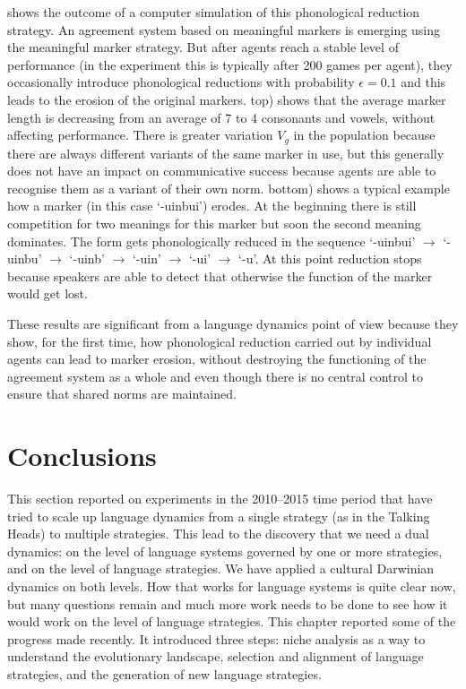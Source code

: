  shows the outcome of a computer simulation of this phonological reduction strategy. An agreement system based on meaningful markers is emerging using the meaningful marker strategy. But after agents reach a stable level of performance
(in the experiment this is typically  
after 200 games per agent), they occasionally introduce phonological reductions with probability $\epsilon=0.1$ 
and this leads to the erosion 
of the original markers.  top) shows that the average marker length is decreasing from an 
average of 7 to 4 consonants and vowels, without affecting performance. There is greater variation $V_g$ in 
the population because there are 
always different variants of the same marker in use, but this generally does not 
have an impact on communicative success because agents are able to recognise them as a variant of their own norm. 
 bottom) shows a typical example how a marker (in this case `-uinbui') erodes. At the beginning there is still 
competition for two meanings for this marker but soon the second meaning dominates. The form gets phonologically 
reduced in the sequence `-uinbui' $\rightarrow$ `-uinbu' $\rightarrow$ `-uinb' $\rightarrow$ `-uin' $\rightarrow$
`-ui' $\rightarrow$ `-u'. At this point reduction stops because speakers are able to detect that 
otherwise the function of the marker would get lost. 

These results are significant from a language dynamics point of view
because they show, for the first time, how phonological reduction carried 
out by individual agents can lead to marker erosion, without destroying the functioning of the agreement system as a whole
and even though there is no central control to ensure that shared norms are maintained. 

\section{Conclusions} 

This section reported on experiments in the 2010--2015 time period that have tried to scale
up language dynamics from a single strategy (as in the Talking Heads) to 
multiple strategies. This lead to the discovery that we need a dual dynamics: on the level of language systems
governed by one or more strategies, and on the level of language strategies. We have applied a cultural Darwinian dynamics 
on both levels. How that works for language systems is quite clear now, but many questions remain and much 
more work needs to be done to see how it would work on the level of language strategies. This chapter reported  
some of the progress made recently. It introduced three steps: niche analysis as a way to understand the evolutionary landscape, 
selection and alignment of language strategies, and the generation of new language strategies. 

